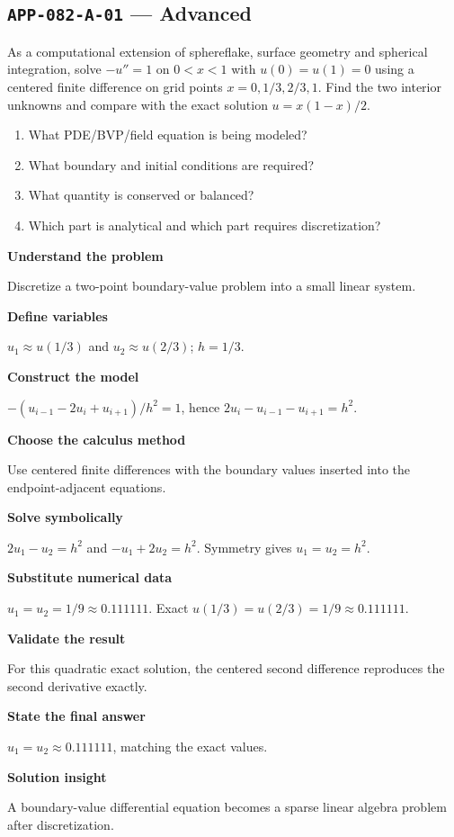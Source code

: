 \documentclass[11pt]{book}
\newcommand{\pid}[1]{\texttt{#1}}
\begin{document}
\subsection*{\pid{APP-082-A-01} — Advanced}
\begin{problembox}
As a computational extension of sphereflake, surface geometry and spherical integration, solve $-u''=1$ on $0<x<1$ with $u(0)=u(1)=0$ using a centered finite difference on grid points $x=0,1/3,2/3,1$. Find the two interior unknowns and compare with the exact solution $u=x(1-x)/2$.
\end{problembox}
\begin{promptbox}\begin{enumerate}
\item What PDE/BVP/field equation is being modeled?
\item What boundary and initial conditions are required?
\item What quantity is conserved or balanced?
\item Which part is analytical and which part requires discretization?
\end{enumerate}\end{promptbox}
\begin{solutionbox}
\textbf{Understand the problem}\par Discretize a two-point boundary-value problem into a small linear system.\par\medskip
\textbf{Define variables}\par $u_1\approx u(1/3)$ and $u_2\approx u(2/3)$; $h=1/3$.\par\medskip
\textbf{Construct the model}\par $-(u_{i-1}-2u_i+u_{i+1})/h^2=1$, hence $2u_i-u_{i-1}-u_{i+1}=h^2$.\par\medskip
\textbf{Choose the calculus method}\par Use centered finite differences with the boundary values inserted into the endpoint-adjacent equations.\par\medskip
\textbf{Solve symbolically}\par $2u_1-u_2=h^2$ and $-u_1+2u_2=h^2$. Symmetry gives $u_1=u_2=h^2$.\par\medskip
\textbf{Substitute numerical data}\par $u_1=u_2=1/9\approx 0.111111$. Exact $u(1/3)=u(2/3)=1/9\approx 0.111111$.\par\medskip
\textbf{Validate the result}\par For this quadratic exact solution, the centered second difference reproduces the second derivative exactly.\par\medskip
\textbf{State the final answer}\par $u_1=u_2\approx 0.111111$, matching the exact values.\par\medskip
\textbf{Solution insight}\par A boundary-value differential equation becomes a sparse linear algebra problem after discretization.\par\medskip
\end{solutionbox}
\end{document}
